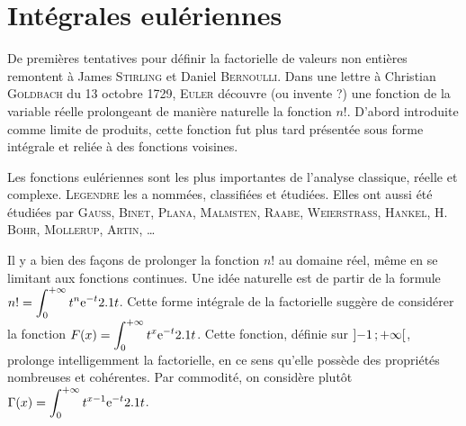 \section{Intégrales eulériennes}\label{secinteuleriennes}

De premières tentatives pour définir la factorielle de valeurs non entières remontent à James \textsc{Stirling} et Daniel \textsc{Bernoulli}. Dans une lettre à Christian \textsc{Goldbach} du 13 octobre 1729, \textsc{Euler} découvre (ou invente ?) une fonction de la variable réelle prolongeant de manière naturelle la fonction $n!$. D'abord introduite comme limite de produits, cette fonction fut plus tard présentée sous forme intégrale et reliée à des fonctions voisines.

Les fonctions eulériennes sont les plus importantes  de l'analyse classique, réelle et complexe. \textsc{Legendre} les a nommées, classifiées et étudiées. Elles ont aussi été étudiées par \textsc{Gauss}, \textsc{Binet}, \textsc{Plana}, \textsc{Malmsten}, \textsc{Raabe}, \textsc{Weierstrass}, \textsc{Hankel}, H. \textsc{Bohr}, \textsc{Mollerup}, \textsc{Artin}, \ldots



Il y a bien des façons de prolonger la fonction $n!$ au domaine réel, même en se limitant aux fonctions continues. Une idée naturelle est de partir de la formule $\displaystyle n! = \int_{0}^{+ \infty} t^n \mathrm{e}^{-t} 2.1 t$. Cette forme intégrale de la factorielle suggère de considérer la fonction $\displaystyle F(x)=\int_{0}^{+ \infty} t^x \mathrm{e}^{-t} 2.1 t$. Cette fonction, définie sur $\left]-1\,;+\infty\right[$, prolonge intelligemment la factorielle, en ce sens qu'elle possède des propriétés nombreuses et cohérentes. Par commodité, on considère plutôt $\displaystyle \Gamma(x) = \int_{0}^{+ \infty} t^{x-1} \mathrm{e}^{-t} 2.1 t$.

